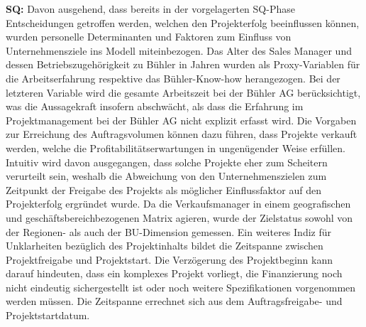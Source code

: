 \documentclass[11pt]{article}
\begin{document}
\newline\newline\textbf{SQ:} Davon ausgehend, dass bereits in der vorgelagerten SQ-Phase Entscheidungen getroffen werden, welchen den Projekterfolg beeinflussen können, wurden personelle Determinanten und Faktoren zum Einfluss von Unternehmensziele ins Modell miteinbezogen. Das Alter des Sales Manager und dessen Betriebszugehörigkeit zu Bühler in Jahren wurden als Proxy-Variablen für die Arbeitserfahrung respektive das Bühler-Know-how herangezogen. Bei der letzteren Variable wird die gesamte Arbeitszeit bei der Bühler AG berücksichtigt, was die Aussagekraft insofern abschwächt, als dass die Erfahrung im Projektmanagement bei der Bühler AG nicht explizit erfasst wird. Die Vorgaben zur Erreichung des Auftragsvolumen können dazu führen, dass Projekte verkauft werden, welche die Profitabilitätserwartungen in ungenügender Weise erfüllen. Intuitiv wird davon ausgegangen, dass solche Projekte eher zum Scheitern verurteilt sein, weshalb die Abweichung von den Unternehmenszielen zum Zeitpunkt der Freigabe des Projekts als möglicher Einflussfaktor auf den Projekterfolg ergründet wurde. Da die Verkaufsmanager in einem geografischen und geschäftsbereichbezogenen Matrix agieren, wurde der Zielstatus sowohl von der Regionen- als auch der BU-Dimension gemessen. Ein weiteres Indiz für Unklarheiten bezüglich des Projektinhalts bildet die Zeitspanne zwischen Projektfreigabe und Projektstart. Die Verzögerung des Projektbeginn kann darauf hindeuten, dass ein komplexes Projekt vorliegt, die Finanzierung noch nicht eindeutig sichergestellt ist oder noch weitere Spezifikationen vorgenommen werden müssen. Die Zeitspanne errechnet sich aus dem Auftragsfreigabe- und Projektstartdatum.
\end{document}
